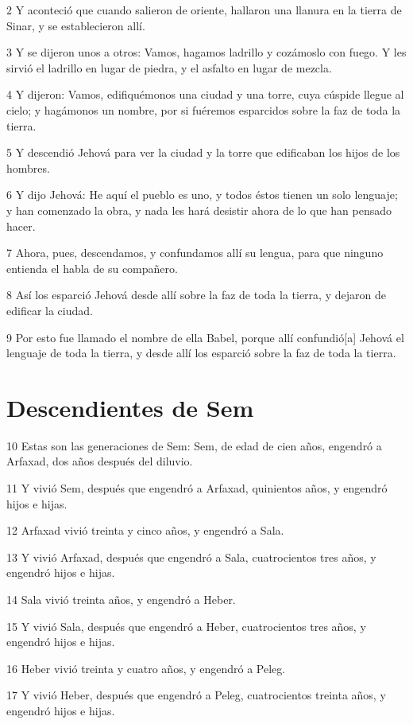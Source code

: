2 Y aconteció que cuando salieron de oriente, hallaron una llanura en la tierra de Sinar, y se establecieron allí.

3 Y se dijeron unos a otros: Vamos, hagamos ladrillo y cozámoslo con fuego. Y les sirvió el ladrillo en lugar de piedra, y el asfalto en lugar de mezcla.

4 Y dijeron: Vamos, edifiquémonos una ciudad y una torre, cuya cúspide llegue al cielo; y hagámonos un nombre, por si fuéremos esparcidos sobre la faz de toda la tierra.

5 Y descendió Jehová para ver la ciudad y la torre que edificaban los hijos de los hombres.

6 Y dijo Jehová: He aquí el pueblo es uno, y todos éstos tienen un solo lenguaje; y han comenzado la obra, y nada les hará desistir ahora de lo que han pensado hacer.

7 Ahora, pues, descendamos, y confundamos allí su lengua, para que ninguno entienda el habla de su compañero.

8 Así los esparció Jehová desde allí sobre la faz de toda la tierra, y dejaron de edificar la ciudad.

9 Por esto fue llamado el nombre de ella Babel, porque allí confundió[a] Jehová el lenguaje de toda la tierra, y desde allí los esparció sobre la faz de toda la tierra.

\section{Descendientes de Sem}

10 Estas son las generaciones de Sem: Sem, de edad de cien años, engendró a Arfaxad, dos años después del diluvio.

11 Y vivió Sem, después que engendró a Arfaxad, quinientos años, y engendró hijos e hijas.

12 Arfaxad vivió treinta y cinco años, y engendró a Sala.

13 Y vivió Arfaxad, después que engendró a Sala, cuatrocientos tres años, y engendró hijos e hijas.

14 Sala vivió treinta años, y engendró a Heber.

15 Y vivió Sala, después que engendró a Heber, cuatrocientos tres años, y engendró hijos e hijas.

16 Heber vivió treinta y cuatro años, y engendró a Peleg.

17 Y vivió Heber, después que engendró a Peleg, cuatrocientos treinta años, y engendró hijos e hijas.


